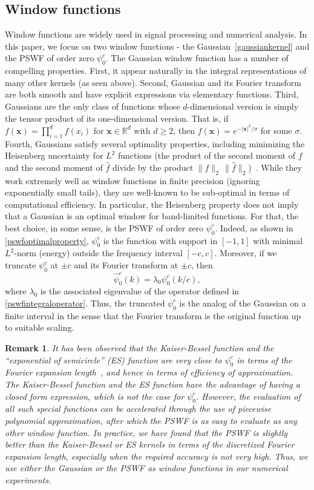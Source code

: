 \documentclass[final,letterpaper]{siamart171218}
\newtheorem{remark}[theorem]{Remark}
\newcommand{\be}{\begin{equation}}
\newcommand{\ee}{\end{equation}}
\newcommand{\x}{\boldsymbol{x}}
\newcommand{\psic}{{\psi_0^c}}
\newcommand{\hpsic}{{\hat{\psi}_0^c}}
\begin{document}
\subsection{Window functions}\label{sec:windownfunctions}
Window functions are widely used in signal processing and numerical analysis. 
In this paper, we focus on two window functions - 
the Gaussian~\eqref{gaussiankernel} and the PSWF
of order zero $\psic$. 
The Gaussian window function has a number of compelling properties. First, it
appear naturally in the integral representations of many other kernels (as seen above).
Second, Gaussian and its Fourier
transform are both smooth and have explicit expressions via elementary functions. 
Third, Gaussians
are the only class of functions whose $d$-dimensional version is simply the tensor product
of its one-dimensional version. 
That is, if $f(\x)=\prod_{i=1}^d f(x_i)$ for $\x\in \mathbb{R}^d$ with
$d\ge 2$, then $f(\x)=e^{-|\x|^2/\sigma}$ for some $\sigma$. Fourth, 
Gaussians satisfy several optimality properties, including minimizing 
the Heisenberg uncertainty for $L^2$ functions (the product of the second moment of 
$f$ and the second moment of $\widehat{f}$ divide by 
the product $\|f\|_2 \, \| \widehat{f}\|_2$)~\cite{dym1975,folland1997jfaa}.
While they work extremely well as window functions in finite precision (ignoring exponentially
small tails), they are well-known to be sub-optimal in terms of computational efficiency.
In particular, the Heisenberg property does not imply that a Gaussian is an optimal
window for band-limited functions. For that, the best choice, in some sense, is
the PSWF of order zero $\psic$.
Indeed, as shown in
\eqref{pswfoptimalproperty}, $\psic$ is the function with support in $[-1,1]$
with minimal $L^2$-norm (energy) outside the frequency interval $[-c,c]$. Moreover, if we
truncate $\psic$ at $\pm c$ and its Fourier transform at $\pm c$, then
\be\label{pswffouriertransform}
\hpsic(k)=\lambda_0 \psic(k/c),
\ee
where $\lambda_0$ is the associated eigenvalue of the operator defined in
\eqref{pswfintegraloperator}. Thus, the truncated $\psic$ is the analog of the Gaussian 
on a finite interval in the sense that the Fourier transform is the 
original function up to suitable scaling.

\begin{remark}
  It has been observed that the Kaiser-Bessel function and the 
  ``exponential of semicircle'' (ES) function are very close
  to $\psic$ in terms of the Fourier expansion length~\cite{barnett2021acha},
  and hence in terms of efficiency of approximation.
  The Kaiser-Bessel function and the ES function have the advantage of having a
  closed form expression, which is not the case for $\psic$. 
  However, the evaluation of all such special functions can be accelerated
  through the use of piecewise polynomial approximation, after which 
  the PSWF is as easy to evaluate as any other window function.
  In practice, we have found that the PSWF is slightly better than the Kaiser-Bessel
  or ES kernels in terms of the discretized Fourier expansion length,
  especially when the required accuracy is not very high. 
  Thus, we use either the Gaussian or the PSWF as window functions in our 
  numerical experiments.
\end{remark}
\end{document}
